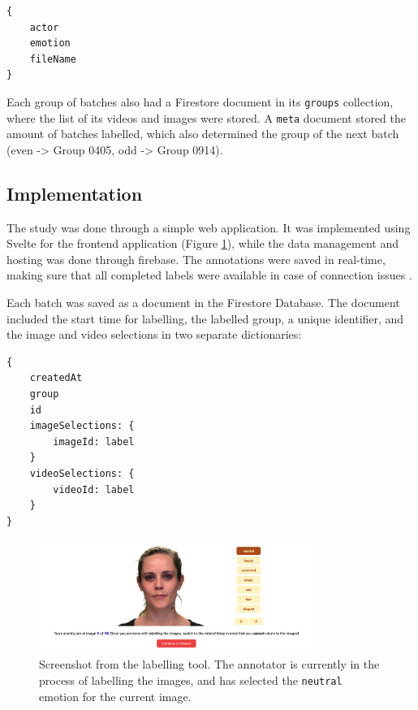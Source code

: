 \begin{lstlisting}
{
    actor
    emotion
    fileName
}
\end{lstlisting}

Each group of batches also had a Firestore document in its \texttt{groups} collection, where the list of its videos and images were stored. A \texttt{meta} document stored the amount of batches labelled, which also determined the group of the next batch (even -> Group 0405, odd -> Group 0914).

\subsection{Implementation}
The study was done through a simple web application. It was implemented using Svelte for the frontend application (Figure \ref{fig:tool_screenshot}), while the data management and hosting was done through firebase. The annotations were saved in real-time, making sure that all completed labels were available in case of connection issues \cite{baur2021}.

Each batch was saved as a document in the Firestore Database. The document included the start time for labelling, the labelled group, a unique identifier, and the image and video selections in two separate dictionaries: 

\begin{lstlisting}
{
    createdAt
    group
    id
    imageSelections: {
        imageId: label
    }
    videoSelections: {
        videoId: label
    }
}
\end{lstlisting}

\begin{figure}
    \centering
    \includegraphics[width=0.8\textwidth]{res/LabellingTool.png}
    \caption{Screenshot from the labelling tool. The annotator is currently in the process of labelling the images, and has selected the \texttt{neutral} emotion for the current image.}
    \label{fig:tool_screenshot}
\end{figure}

